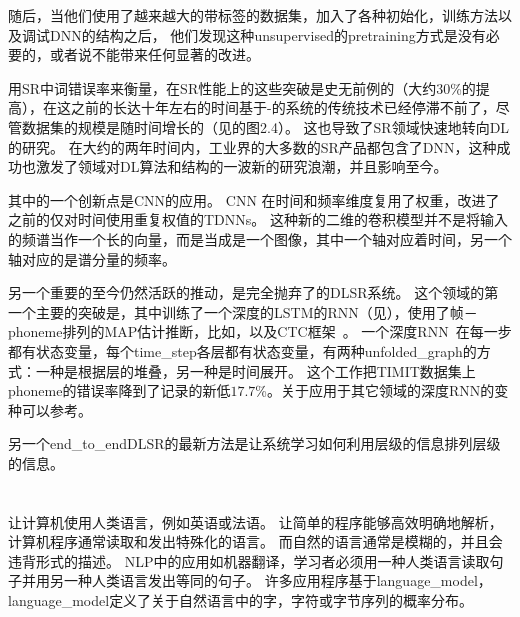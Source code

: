 随后，当他们使用了越来越大的带标签的数据集，加入了各种初始化，训练方法以及调试\gls{DNN}的结构之后，
他们发现这种\gls{unsupervised}的\gls{pretraining}方式是没有必要的，或者说不能带来任何显著的改进。

用\gls{SR}中词错误率来衡量，在\gls{SR}性能上的这些突破是史无前例的（大约$30$\%的提高），在这之前的长达十年左右的时间基于-的系统的传统技术已经停滞不前了，尽管数据集的规模是随时间增长的（见\citet{Deng+Yu-2014}的图2.4）。
这也导致了\gls{SR}领域快速地转向\gls{DL}的研究。
在大约的两年时间内，工业界的大多数的\gls{SR}产品都包含了\gls{DNN}，这种成功也激发了领域对\gls{DL}算法和结构的一波新的研究浪潮，并且影响至今。

其中的一个创新点是\gls{CNN}的应用\citep{Sainath-et-al-ICASSP2013}。
\gls{CNN} 在时间和频率维度复用了权重，改进了之前的仅对时间使用重复权值的\gls{TDNNs}。
这种新的二维的卷积模型并不是将输入的频谱当作一个长的向量，而是当成是一个图像，其中一个轴对应着时间，另一个轴对应的是谱分量的频率。

另一个重要的至今仍然活跃的推动，是完全抛弃了的\gls{DL}\gls{SR}系统。
这个领域的第一个主要的突破是\citet{Graves-et-al-ICASSP2013}，其中训练了一个深度的\gls{LSTM}的\gls{RNN}（见），使用了帧－\gls{phoneme}排列的\gls{MAP}估计推断，比如\citet{chapter-gradient-document-2001}，以及CTC框架~\citep{Graves-et-al-2006,Graves-book2012}。
一个深度\gls{RNN}~\citep{Graves-et-al-ICASSP2013}在每一步都有状态变量，每个\gls{time_step}各层都有状态变量，有两种\gls{unfolded_graph}的方式：一种是根据层的堆叠，另一种是时间展开。
这个工作把TIMIT数据集上\gls{phoneme}的错误率降到了记录的新低$17.7$\%。关于应用于其它领域的深度\gls{RNN}的变种可以参考\citet{Pascanu-et-al-ICLR2014,Chung-et-al-NIPSDL2014-small}。

另一个\gls{end_to_end}\gls{DL}\gls{SR}的最新方法是让系统学习如何利用层级的信息排列层级的信息\citep{Chorowski-et-al-arxiv2014,llu_is2015b}。


\section{}
\label{sec: natural_language_processing}

让计算机使用人类语言，例如英语或法语。
让简单的程序能够高效明确地解析，计算机程序通常读取和发出特殊化的语言。
而自然的语言通常是模糊的，并且会违背形式的描述。
\gls{NLP}中的应用如机器翻译，学习者必须用一种人类语言读取句子并用另一种人类语言发出等同的句子。
许多应用程序基于\gls{language_model}，\gls{language_model}定义了关于自然语言中的字，字符或字节序列的概率分布。

